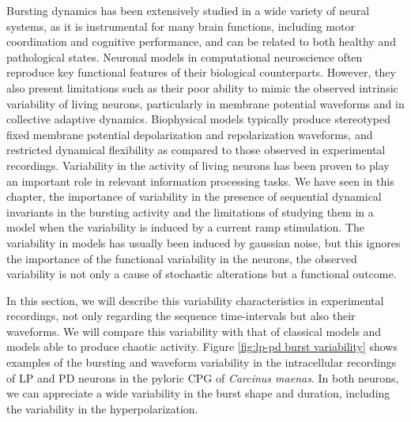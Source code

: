 Bursting dynamics has been extensively studied in a wide variety of neural systems, as it is instrumental for many brain functions, including motor coordination and cognitive performance, and can be related to both healthy and pathological states. Neuronal models in computational neuroscience often reproduce key functional features of their biological counterparts. However, they also present limitations such as their poor ability to mimic the observed intrinsic variability of living neurons, particularly in membrane potential waveforms and in collective adaptive dynamics. Biophysical models typically produce stereotyped fixed membrane potential depolarization and repolarization waveforms, and restricted dynamical flexibility as compared to those observed in experimental recordings. Variability in the activity of living neurons has been proven to play an important role in relevant information processing tasks. We have seen in this chapter, the importance of variability in the presence of sequential dynamical invariants in the bursting activity and the limitations of studying them in a model when the variability is induced by a current ramp stimulation. The variability in models has usually been induced by gaussian noise, but this ignores the importance of the functional variability in the neurons, the observed variability is not only a cause of stochastic alterations but a functional outcome. 

In this section, we will describe this variability characteristics in experimental recordings, not only regarding the sequence time-intervals but also their waveforms. We will compare this variability with that of classical models and models able to produce chaotic activity. 
Figure \ref{fig:lp-pd burst variability} shows examples of the bursting and waveform variability in the intracellular recordings of LP and PD neurons in the pyloric CPG of \textit{Carcinus maenas}. In both neurons, we can appreciate a wide variability in the burst shape and duration, including the variability in the hyperpolarization.


